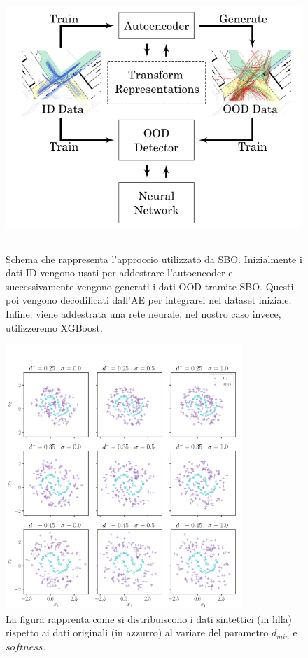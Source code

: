 \begin{figure}[htpb]
    \centering
    \includegraphics[width=\textwidth,height=10cm,keepaspectratio=true]{img/sbo_schema.png}
    \caption{
        Schema che rappresenta l'approccio utilizzato da SBO. Inizialmente i dati ID vengono usati per addestrare l'autoencoder e successivamente vengono generati i dati OOD tramite SBO. Questi poi vengono decodificati dall'AE per integrarsi nel dataset iniziale. Infine, viene addestrata una rete neurale, nel nostro caso invece, utilizzeremo XGBoost.
    }
    \label{fig:sbo_schema}
\end{figure}

\begin{figure}[htpb]
    \centering
    \includegraphics[width=\textwidth,height=10cm,keepaspectratio=true]{img/sbo_dmin.png}
    \caption{
      La figura rapprenta come si distribuiscono i dati sintettici (in lilla) rispetto ai dati originali (in azzurro) al variare del parametro $d_{min}$ e $softness$.
    }
    \label{fig:sbo_dmin}
\end{figure}


